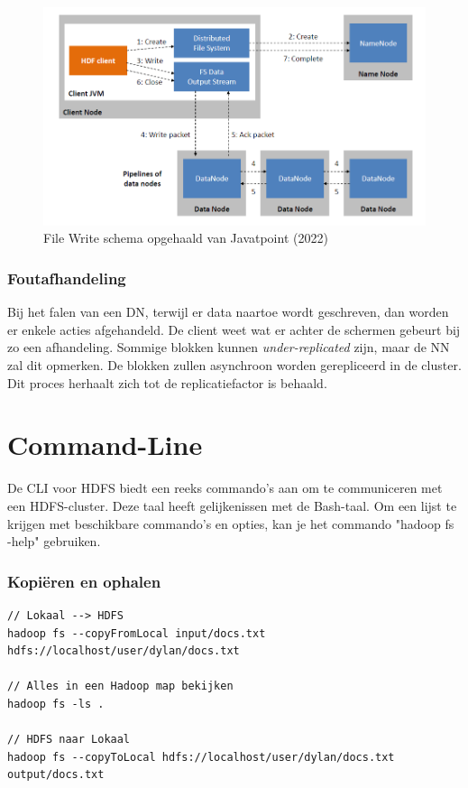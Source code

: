 \documentclass[a4paper,10pt,twoside]{report}
\begin{document}
\begin{figure}
	\includegraphics[width=\linewidth]{images/HDFS-Write.png}
	\caption{File Write schema opgehaald van Javatpoint (2022)}
\end{figure}

\subsubsection{Foutafhandeling}

Bij het falen van een DN, terwijl er data naartoe wordt geschreven, dan worden er enkele acties afgehandeld. De client weet wat er achter de schermen gebeurt bij zo een afhandeling. Sommige blokken kunnen \textit{under-replicated} zijn, maar de NN zal dit opmerken. De blokken zullen asynchroon worden gerepliceerd in de cluster. Dit proces herhaalt zich tot de replicatiefactor is behaald.

\section{Command-Line}

De CLI voor HDFS biedt een reeks commando's aan om te communiceren met een HDFS-cluster. Deze taal heeft gelijkenissen met de Bash-taal. Om een lijst te krijgen met beschikbare commando's en opties, kan je het commando "hadoop fs -help" gebruiken.

\subsubsection{Kopiëren en ophalen}

\begin{lstlisting}[language=Hadoop]
// Lokaal --> HDFS
hadoop fs --copyFromLocal input/docs.txt hdfs://localhost/user/dylan/docs.txt

// Alles in een Hadoop map bekijken
hadoop fs -ls .

// HDFS naar Lokaal
hadoop fs --copyToLocal hdfs://localhost/user/dylan/docs.txt output/docs.txt
\end{lstlisting}
\end{document}
